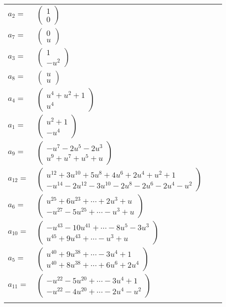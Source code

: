 \documentclass[1p]{elsarticle_modified}
\theoremstyle{definition}
\begin{document}
\begin{tabular}{m{7pt} m{180pt} m{7pt} m{180pt} }
\flushright $a_{2}=$&$\begin{pmatrix}1\\0\end{pmatrix}$ \\
\flushright $a_{7}=$&$\begin{pmatrix}0\\u\end{pmatrix}$ \\
\flushright $a_{3}=$&$\begin{pmatrix}1\\- u^2\end{pmatrix}$ \\
\flushright $a_{8}=$&$\begin{pmatrix}u\\u\end{pmatrix}$ \\
\flushright $a_{4}=$&$\begin{pmatrix}u^4+u^2+1\\u^4\end{pmatrix}$ \\
\flushright $a_{1}=$&$\begin{pmatrix}u^2+1\\- u^4\end{pmatrix}$ \\
\flushright $a_{9}=$&$\begin{pmatrix}- u^7-2 u^5-2 u^3\\u^9+u^7+u^5+u\end{pmatrix}$ \\
\flushright $a_{12}=$&$\begin{pmatrix}u^{12}+3 u^{10}+5 u^8+4 u^6+2 u^4+u^2+1\\- u^{14}-2 u^{12}-3 u^{10}-2 u^8-2 u^6-2 u^4- u^2\end{pmatrix}$ \\
\flushright $a_{6}=$&$\begin{pmatrix}u^{25}+6 u^{23}+\cdots+2 u^3+u\\- u^{27}-5 u^{25}+\cdots- u^3+u\end{pmatrix}$ \\
\flushright $a_{10}=$&$\begin{pmatrix}- u^{43}-10 u^{41}+\cdots-8 u^5-3 u^3\\u^{45}+9 u^{43}+\cdots- u^3+u\end{pmatrix}$ \\
\flushright $a_{5}=$&$\begin{pmatrix}u^{40}+9 u^{38}+\cdots-3 u^4+1\\u^{40}+8 u^{38}+\cdots+6 u^6+2 u^4\end{pmatrix}$ \\
\flushright $a_{11}=$&$\begin{pmatrix}- u^{22}-5 u^{20}+\cdots-3 u^4+1\\- u^{22}-4 u^{20}+\cdots-2 u^4- u^2\end{pmatrix}$\\&\end{tabular}
\end{document}
